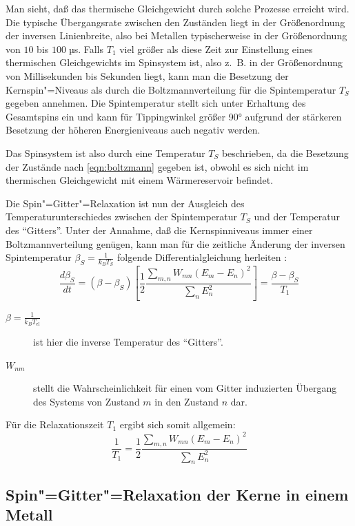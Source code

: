 Man sieht, daß das thermische Gleichgewicht durch solche Prozesse erreicht wird. Die typische
Übergangsrate zwischen den Zuständen liegt in der Größenordnung der inversen Linienbreite, also bei
Metallen typischerweise in der Größenordnung von $10$ bis $100\;µ$s. Falls $T_1$ viel größer als
diese Zeit zur Einstellung eines thermischen Gleichgewichts im Spinsystem ist, also z.\ B. in der
Größenordnung von Millisekunden bis Sekunden liegt, kann man die Besetzung der Kernspin"=Niveaus
als durch die Boltzmannverteilung für die Spintemperatur $T_S$ gegeben annehmen. Die Spintemperatur
stellt sich unter Erhaltung des Gesamtspins ein und kann für Tippingwinkel größer 90° aufgrund der
stärkeren Besetzung der höheren Energieniveaus auch negativ werden.

Das Spinsystem ist also durch eine Temperatur $T_S$ beschrieben, da die Besetzung der Zustände nach
\eqref{eqn:boltzmann} gegeben ist, obwohl es sich nicht im thermischen
Gleichgewicht mit einem Wärmereservoir befindet.

Die Spin"=Gitter"=Relaxation ist nun der Ausgleich des Temperaturunterschiedes zwischen der
Spintemperatur $T_S$ und der Temperatur des "`Gitters"'. Unter der Annahme, daß die
Kernspinniveaus immer einer Boltzmannverteilung genügen, kann man für die zeitliche Änderung der
inversen Spintemperatur $\beta_S=\frac1{k_BT_S}$ folgende Differentialgleichung herleiten \cite[S. 148ff]{Slichter}:
	\begin{equation}
		\frac{d\beta_S}{dt}=(\beta-\beta_S)\left[\frac12\frac{\sum_{m,n}W_{mn}(E_m-E_n)^2}{\sum_nE^2_n}\right]
			= \frac{\beta-\beta_S}{T_1}
	\end{equation}
\begin{description}
	\item[$\beta=\frac1{k_BT_\mathrm{el}}$] ist hier die inverse Temperatur des "`Gitters"'.
	\item[$W_{nm}$] stellt die Wahrscheinlichkeit für einen vom Gitter induzierten Übergang des
		Systems von Zustand $m$ in den Zustand $n$ dar.
\end{description}
Für die Relaxationszeit $T_1$ ergibt sich somit allgemein:
	\begin{equation}
		\label{eqn:t1}
		\frac1{T_1}=\frac12\frac{\sum_{m,n}W_{mn}(E_m-E_n)^2}{\sum_nE^2_n}
	\end{equation}

\subsection{Spin"=Gitter"=Relaxation der Kerne in einem Metall}

